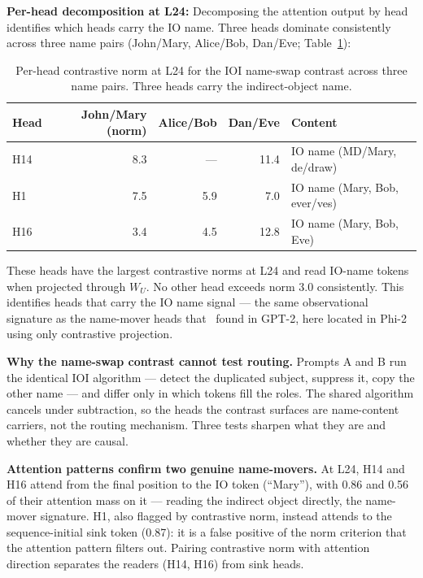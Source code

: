 \documentclass[11pt]{article}
\newcommand{\WU}{W_U}
\begin{document}
\textbf{Per-head decomposition at L24:} Decomposing the attention output by head
identifies which heads carry the IO name. Three heads dominate consistently
across three name pairs (John/Mary, Alice/Bob, Dan/Eve; Table~\ref{tab:ioi-heads}):

\begin{table}[htbp]
\centering
\small
\begin{tabular}{lrrrl}
\toprule
Head & John/Mary (norm) & Alice/Bob & Dan/Eve & Content \\
\midrule
H14 & 8.3 & --- & 11.4 & IO name (MD/Mary, de/draw) \\
H1 & 7.5 & 5.9 & 7.0 & IO name (Mary, Bob, ever/ves) \\
H16 & 3.4 & 4.5 & 12.8 & IO name (Mary, Bob, Eve) \\
\bottomrule
\end{tabular}
\caption{Per-head contrastive norm at L24 for the IOI name-swap contrast across three name pairs. Three heads carry the indirect-object name.}
\label{tab:ioi-heads}
\end{table}

These heads have the largest contrastive norms at L24 and read IO-name tokens
when projected through $\WU$. No other head exceeds norm 3.0 consistently. This
identifies heads that carry the IO name signal --- the same observational
signature as the name-mover heads that~\citet{wang2023} found in GPT-2, here
located in Phi-2 using only contrastive projection.

\textbf{Why the name-swap contrast cannot test routing.} Prompts A and B run the
identical IOI algorithm --- detect the duplicated subject, suppress it, copy the
other name --- and differ only in which tokens fill the roles. The shared
algorithm cancels under subtraction, so the heads the contrast surfaces are
name-content carriers, not the routing mechanism. Three tests sharpen what they
are and whether they are causal.

\textbf{Attention patterns confirm two genuine name-movers.} At L24, H14 and H16
attend from the final position to the IO token (``Mary''), with 0.86 and 0.56 of
their attention mass on it --- reading the indirect object directly, the
name-mover signature. H1, also flagged by contrastive norm, instead attends to
the sequence-initial sink token (0.87): it is a false positive of the norm
criterion that the attention pattern filters out. Pairing contrastive norm with
attention direction separates the readers (H14, H16) from sink heads.
\end{document}
